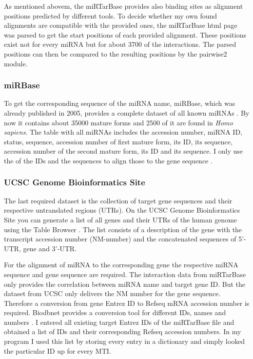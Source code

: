 \documentclass[12pt]{article}
\begin{document}
As mentioned abovem, the miRTarBase provides also binding sites as alignment positions predicted by different tools. To decide whether my own found alignments are compatible with the provided ones, the miRTarBase html page was parsed to get the start positions of each provided alignment. These positions exist not for every miRNA but for about 3700 of the interactions. The parsed positions can then be compared to the resulting positions by the pairwise2 module. 

\subsubsection{miRBase}
To get the corresponding sequence of the miRNA name, miRBase, which was already published in 2005, provides a complete dataset of all known miRNAs \cite{Griffiths-Jones}. By now it contains about 35000 mature forms and 2500 of it are found in \textit{Homo sapiens}. The table with all miRNAs includes the accession number, miRNA ID, status, sequence, accession number of first mature form, its ID, its sequence, accession number of the second mature form, its ID and its sequence. I only use the of the IDs and the sequences to align those to the gene sequence \cite{mirbase}.

 
\subsubsection{UCSC Genome Bioinformatics Site}
The last required dataset is the collection of target gene sequences and their respective untranslated regions (UTRs). On the UCSC Genome Bioinformatics Site you can generate a list of all genes and their UTRs of the human genome using the Table Browser \cite{ucsc}. The list consists of a description of the gene with the transcript accession number (NM-number) and the concatenated sequences of 5'-UTR, gene and 3'-UTR.

For the alignment of miRNA to the corresponding gene the respective miRNA sequence and gene sequence are required. The interaction data from miRTarBase only provides the correlation between miRNA name and target gene ID. But the dataset from UCSC only delivers the NM number for the gene sequence. Therefore a conversion from gene Entrez ID to Refseq mRNA accession number is required. Biodbnet provides a conversion tool for different IDs, names and numbers \cite{biodb}. I entered all existing target Entrez IDs of the miRTarBase file and obtained a list of IDs and their corresponding Refseq accession numbers. In my program I used this list by storing every entry in a dictionary and simply looked the particular ID up for every MTI. 
 
\end{document}
